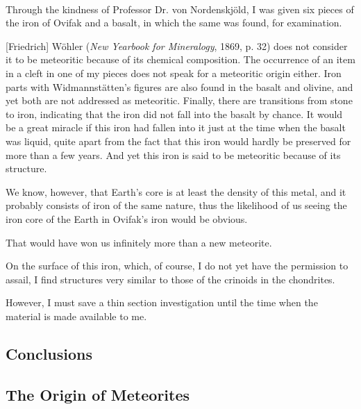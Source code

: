 \documentclass[a4paper, 12pt, oneside]{article}
\begin{document}
\paragraph*{}
Through the kindness of Professor Dr. von Nordenskjöld, I was given six pieces of the iron of Ovifak and a basalt, in which the same was found, for examination.

[Friedrich] Wöhler (\emph{New Yearbook for Mineralogy}, 1869, p. 32) does not consider it to be meteoritic because of its chemical composition. The occurrence of an item in a cleft in one of my pieces does not speak for a meteoritic origin either. Iron parts with Widmannstätten's figures are also found in the basalt and olivine, and yet both are not addressed as meteoritic. Finally, there are transitions from stone to iron, indicating that the iron did not fall into the basalt by chance. It would be a great miracle if this iron had fallen into it just at the time when the basalt was liquid, quite apart from the fact that this iron would hardly be preserved for more than a few years. And yet this iron is said to be meteoritic because of its structure.

We know, however, that Earth's core is at least the density of this metal, and it probably consists of iron of the same nature, thus the likelihood of us seeing the iron core of the Earth in Ovifak's iron would be obvious.

That would have won us infinitely more than a new meteorite.

On the surface of this iron, which, of course, I do not yet have the permission to assail, I find structures very similar to those of the crinoids in the chondrites.

However, I must save a thin section investigation until the time when the material is made available to me.
\clearpage
\subsection{Conclusions}
\subsection{The Origin of Meteorites}
\end{document}
